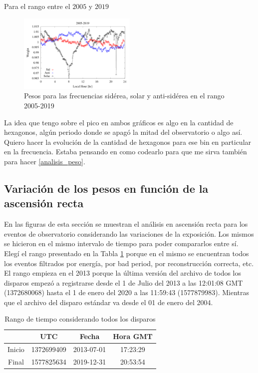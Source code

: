 Para el rango entre el $2005$ y $2019$
\begin{figure}[H]
	\centering
	\includegraphics[width=0.5\textwidth]{weigth2005-2019.png}
	\caption{Pesos para las frecuencias sidérea, solar y anti-sidérea en el rango 2005-2019}
	\label{fig:pesos_2019}
\end{figure}




La idea que tengo sobre el pico en ambos gráficos es algo en la cantidad de hexagonos, algún periodo donde se apagó la mitad del observatorio o algo así. Quiero hacer la evolución de la cantidad de hexagonos para ese bin en particular en la frecuencia. Estaba pensando en como codearlo para que me sirva también para hacer \ref{analisis_peso}.




\subsection{Variación de los pesos en función de la ascensión recta}
En las figuras de esta sección se muestran el análisis en ascensión recta para los eventos de observatorio considerando las variaciones de la exposición. 
Los mismos se hicieron en el mismo intervalo de tiempo para poder compararlos entre sí. Elegí el rango presentado en la Tabla \ref{rango_corto}  porque en el mismo se encuentran todos los eventos filtrados por energía, por bad period, por reconstrucción correcta, etc. El rango empieza en el 2013 porque la última versión del archivo de todos los disparos empezó a registrarse desde el  1 de Julio del 2013 a las 12:01:08 GMT (1372680068) hasta el  1 de enero del 2020 a las 11:59:43 (1577879983). Mientras que el archivo del disparo estándar va desde el 01 de enero del 2004.

	\begin{table}[H]
	\centering
		\begin{tabular}{c|c|c|c}
	 		& UTC 			& Fecha		 	&  Hora GMT  \\ \hline
	Inicio	& 1372699409	&2013-07-01 	&17:23:29		\\
	Final 	& 1577825634	&2019-12-31 	&20:53:54		\\
		\end{tabular}
	\caption{Rango de tiempo considerando todos los disparos} 	\label{rango_corto}
	\end{table}


